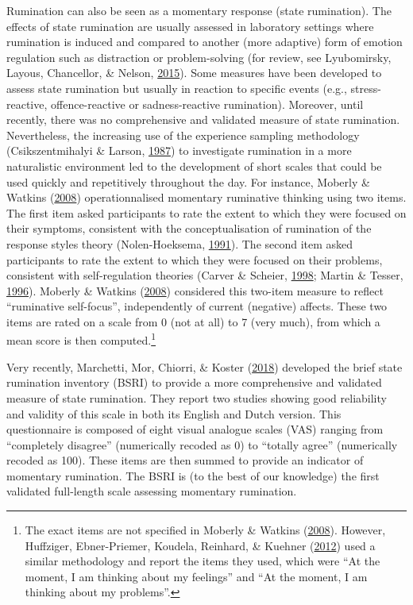 \documentclass[a4paper,12pt,twoside,onecolumn,openright,final,oldfontcommands]{memoir}
\let\rmarkdownfootnote\footnote%
\def\footnote{\protect\rmarkdownfootnote}
\begin{document}
Rumination can also be seen as a momentary response (state rumination). The effects of state rumination are usually assessed in laboratory settings where rumination is induced and compared to another (more adaptive) form of emotion regulation such as distraction or problem-solving (for review, see Lyubomirsky, Layous, Chancellor, \& Nelson, \protect\hyperlink{ref-lyubomirsky_thinking_2015}{2015}). Some measures have been developed to assess state rumination but usually in reaction to specific events (e.g., stress-reactive, offence-reactive or sadness-reactive rumination). Moreover, until recently, there was no comprehensive and validated measure of state rumination. Nevertheless, the increasing use of the experience sampling methodology (Csikszentmihalyi \& Larson, \protect\hyperlink{ref-csikszentmihalyi_validity_1987}{1987}) to investigate rumination in a more naturalistic environment led to the development of short scales that could be used quickly and repetitively throughout the day. For instance, Moberly \& Watkins (\protect\hyperlink{ref-Moberly2008}{2008}) operationnalised momentary ruminative thinking using two items. The first item asked participants to rate the extent to which they were focused on their symptoms, consistent with the conceptualisation of rumination of the response styles theory (Nolen-Hoeksema, \protect\hyperlink{ref-nolen-hoeksema_responses_1991}{1991}). The second item asked participants to rate the extent to which they were focused on their problems, consistent with self-regulation theories (Carver \& Scheier, \protect\hyperlink{ref-carver_self-regulation_1998}{1998}; Martin \& Tesser, \protect\hyperlink{ref-Martin}{1996}). Moberly \& Watkins (\protect\hyperlink{ref-Moberly2008}{2008}) considered this two-item measure to reflect \enquote{ruminative self-focus}, independently of current (negative) affects. These two items are rated on a scale from 0 (not at all) to 7 (very much), from which a mean score is then computed.\footnote{The exact items are not specified in Moberly \& Watkins (\protect\hyperlink{ref-Moberly2008}{2008}). However, Huffziger, Ebner-Priemer, Koudela, Reinhard, \& Kuehner (\protect\hyperlink{ref-Huffziger2012}{2012}) used a similar methodology and report the items they used, which were \enquote{At the moment, I am thinking about my feelings} and \enquote{At the moment, I am thinking about my problems}.}

Very recently, Marchetti, Mor, Chiorri, \& Koster (\protect\hyperlink{ref-marchetti_brief_2018}{2018}) developed the brief state rumination inventory (BSRI) to provide a more comprehensive and validated measure of state rumination. They report two studies showing good reliability and validity of this scale in both its English and Dutch version. This questionnaire is composed of eight visual analogue scales (VAS) ranging from \enquote{completely disagree} (numerically recoded as 0) to \enquote{totally agree} (numerically recoded as 100). These items are then summed to provide an indicator of momentary rumination. The BSRI is (to the best of our knowledge) the first validated full-length scale assessing momentary rumination.
\end{document}

